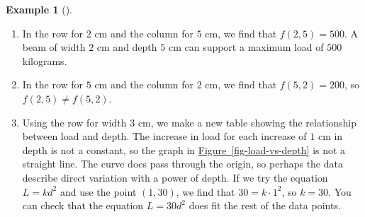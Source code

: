 \documentclass[10pt,]{book}
\theoremstyle{plain}
\theoremstyle{definition}
\theoremstyle{definition}
\theoremstyle{definition}
\newtheorem{example}[theorem]{Example}
\theoremstyle{definition}
\theoremstyle{definition}
\numberwithin{equation}{section}
\newcommand{\hrulethin}  {\noalign{\hrule height 0.04em}}
\newcommand{\hrulethick} {\noalign{\hrule height 0.11em}}
\newcounter{figstack}
\newlength\fight
\newcommand\pushValignCaptionBottom[5][b]{%
\stepcounter{figstack}%
\expandafter\def\csname %
figalign\romannumeral\value{figstack}\endcsname{#1}%
\expandafter\def\csname %
figtype\romannumeral\value{figstack}\endcsname{#2}%
\expandafter\def\csname %
figwd\romannumeral\value{figstack}\endcsname{#3}%
\expandafter\def\csname %
figcontent\romannumeral\value{figstack}\endcsname{#4}%
\expandafter\def\csname %
figcap\romannumeral\value{figstack}\endcsname{#5}%
\setbox0=\hbox{%
\begin{#2}{#3}#4\end{#2}}%
\ifdim\dimexpr\ht0+\dp0\relax>\fight\global\setlength{\fight}{%
\dimexpr\ht0+\dp0\relax}\fi%
}
\begin{document}
\begin{example}[]
\begin{enumerate}[label=*\alph**]
\item\hypertarget{li-578}{}In the row for \(2\) cm and the column for \(5\) cm, we find that \(f (2, 5) = 500\). A beam of width \(2\) cm and depth \(5\) cm can support a maximum load of \(500\) kilograms.\item\hypertarget{li-579}{}In the row for \(5\) cm and the column for \(2\) cm, we find that \(f (5, 2) = 200\), so \(f (2, 5) \ne f (5, 2)\).\item\hypertarget{li-580}{}Using the row for width \(3\) cm, we make a new table showing the relationship between load and depth. The increase in load for each increase of \(1\) cm in depth is not a constant, so the graph in \hyperref[fig-load-vs-depth]{Figure~\ref{fig-load-vs-depth}} is not a straight line. The curve does pass through the origin, so perhaps the data describe direct variation with a power of depth. If we try the equation \(L = kd^2\) and use the point \((1, 30)\), we find that \(30 = k · 1^2\), so \(k = 30\). You can check that the equation \(L = 30d^2\) does fit the rest of the data points.\end{enumerate}
\leavevmode%
\end{example}
\end{document}
